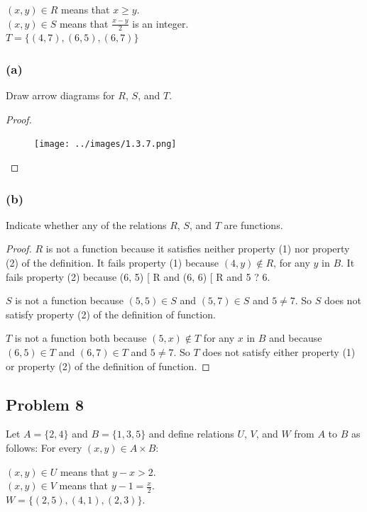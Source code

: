 \documentclass[14pt]{extarticle}
\begin{document}
\begin{center}
    $(x, y) \in R$ means that $x \geq y$. \\
    $(x, y) \in S$ means that $\frac{x-y}{2}$ is an integer. \\
    $T = \{(4, 7), (6, 5), (6, 7)\}$
\end{center}

\subsubsection{(a)}
Draw arrow diagrams for $R$, $S$, and $T$.

\begin{proof}
    \begin{figure}[ht!]
        \centering
        \texttt{[image: ../images/1.3.7.png]}
    \end{figure}
\end{proof}

\subsubsection{(b)}
Indicate whether any of the relations $R$, $S$, and $T$ are functions.

\begin{proof}
    $R$ is not a function because it satisfies neither property (1) nor property (2)
    of the definition. It fails property (1) because $(4, y) \notin R$, for any $y$
    in $B$. It fails property (2) because (6, 5) [ R and (6, 6) [ R and 5 ? 6.

    $S$ is not a function because $(5, 5) \in S$ and $(5, 7) \in S$ and
    $5 \neq 7$. So $S$ does not satisfy property (2) of the definition of function.

    $T$ is not a function both because $(5, x) \notin T$ for any $x$ in $B$ and
    because $(6, 5) \in T$ and $(6, 7) \in T$ and $5 \neq 7$. So $T$ does not
    satisfy either property (1) or property (2) of the definition of function.
\end{proof}

\subsection{Problem 8}
Let $A = \{2, 4\}$ and $B = \{1, 3, 5\}$ and define relations $U$, $V$, and
$W$ from $A$ to $B$ as follows: For every $(x, y) \in A \times B$:
\begin{center}
    $(x, y) \in U$ means that $y - x > 2$.\\
    $(x, y) \in V$ means that $y - 1 = \frac{x}{2}$.\\
    $W = \{(2, 5), (4, 1), (2, 3)\}$.
\end{center}
\end{document}
